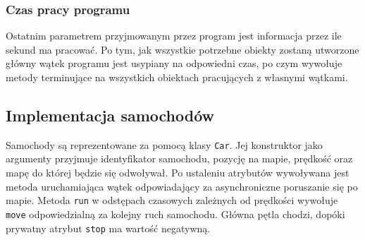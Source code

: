 \documentclass[a4paper]{article}
\begin{document}
\subsubsection{Czas pracy programu}
Ostatnim parametrem przyjmowanym przez program jest informacja przez ile sekund ma pracować. Po tym, jak wszystkie potrzebne obiekty zostaną utworzone główny wątek programu jest usypiany na odpowiedni czas, po czym wywołuje metody terminujące na wszystkich obiektach pracujących z własnymi wątkami.

\subsection{Implementacja samochodów}
Samochody są reprezentowane za pomocą klasy \verb+Car+. Jej konstruktor jako argumenty przyjmuje identyfikator samochodu, pozycję na mapie, prędkość oraz mapę do której będzie się odwoływał. Po ustaleniu atrybutów wywoływana jest metoda uruchamiająca wątek odpowiadający za asynchroniczne poruszanie się po mapie. Metoda \verb+run+ w odstępach czasowych zależnych od prędkości wywołuje \verb+move+ odpowiedzialną za kolejny ruch samochodu. Główna pętla chodzi, dopóki prywatny atrybut \verb+stop+ ma wartość negatywną.
\end{document}
